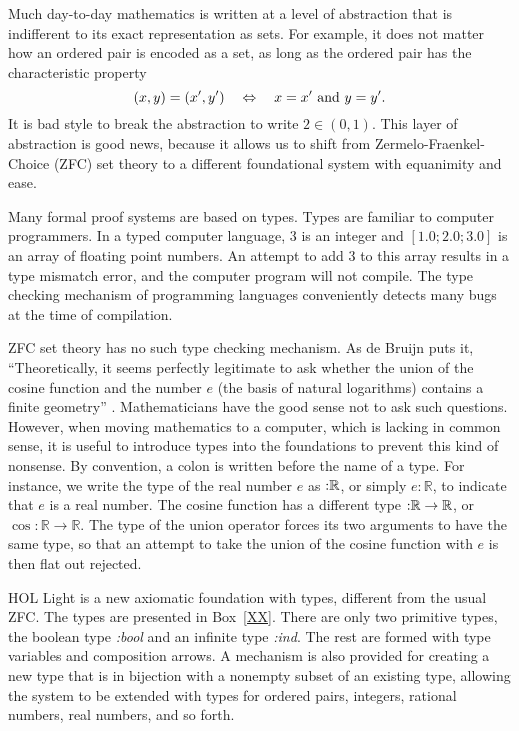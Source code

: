 \documentclass{llncs}
\def\tc{\hbox{:}}
\newcommand{\ring}[1]{\mathbb{#1}}
\begin{document}
Much day-to-day mathematics is written at a level of abstraction that is
indifferent to its exact representation  as sets.  For example, 
it does not matter how an ordered pair is encoded as a 
set, as long as the ordered pair has the characteristic property
 $$
 (x,y) = (x',y') \quad \Leftrightarrow\quad  x = x' \hbox{ and } y=y'.
 $$
It is bad style to break the abstraction to write $2\in(0,1)$.
This layer of abstraction is good news, because it allows us to shift
from Zermelo-Fraenkel-Choice (ZFC) set theory  to a different foundational system with equanimity and ease.  

Many
formal proof systems  are based on
types.  Types are familiar to computer programmers.  In a typed computer language,
$3$ is an integer and $[1.0;2.0;3.0]$ is an array of floating point numbers. An attempt
to add $3$ to this array results in a type mismatch error, and the computer program
will not compile.  The type checking mechanism of programming languages
conveniently detects many bugs at the time of compilation. 


ZFC set theory has no such type checking mechanism.  As de Bruijn
puts it,
``Theoretically, it seems perfectly legitimate
to ask whether the union of the cosine function
and the number $e$ (the basis of natural
logarithms) contains a finite geometry'' \cite{dbXY}.
Mathematicians have the good sense not to ask such questions.  However, when moving
mathematics to a computer, which is lacking in common sense, it is useful to introduce types
into the foundations
to prevent this kind of nonsense.  By convention,  a colon is written before the name of a type.  For instance, we write the type of the real number $e$ as $\tc\ring{R}$, or simply $e:\ring{R}$, to indicate that $e$ is a real number.
The cosine function has a different type $\tc\ring{R}\to\ring{R}$,
or $\cos:\ring{R}\to\ring{R}$.
The type of the union operator 
forces its two arguments to have the same type,
so that an attempt to take the union of the cosine function with $e$ is then flat out rejected.

HOL Light is a new axiomatic foundation with types, 
 different from the usual ZFC.
The types are presented in Box~\ref{XX}.  There are only two primitive
types, the boolean type {\it \tc bool} and an infinite type {\it \tc ind}. The rest are formed
with type variables and composition arrows.
A mechanism is also provided for creating a new type
that is in bijection with a nonempty subset of an existing type,
allowing the system
to be extended with types for ordered pairs, integers, rational numbers, real numbers,
and so forth.
\end{document}
